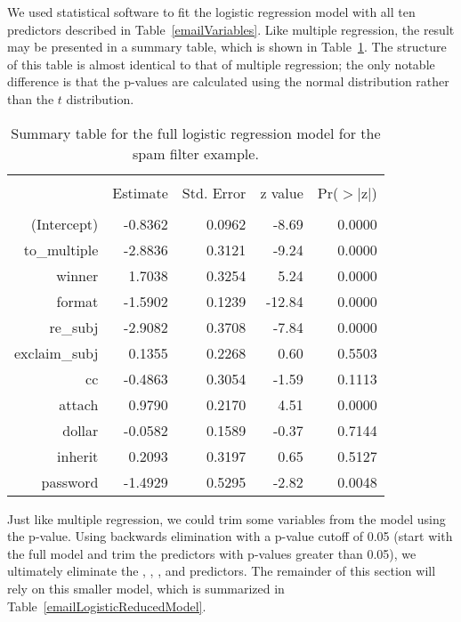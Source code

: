 We used statistical software to fit the logistic regression model with all ten predictors described in Table~\ref{emailVariables}. Like multiple regression, the result may be presented in a summary table, which is shown in Table~\ref{emailLogisticModelResults}. The structure of this table is almost identical to that of multiple regression; the only notable difference is that the p-values are calculated using the normal distribution rather than the $t$ distribution.

\begin{table}[ht]
\centering
\begin{tabular}{rrrrr}
  \hline
  \vspace{-3.7mm} & & & & \\
 & Estimate & Std. Error & z value & Pr($>$$|$z$|$) \\ 
  \hline
  \vspace{-3.8mm} & & & & \\
(Intercept) & -0.8362 & 0.0962 & -8.69 & 0.0000 \\ 
  to\_\hspace{0.3mm}multiple & -2.8836 & 0.3121 & -9.24 & 0.0000 \\ 
  winner & 1.7038 & 0.3254 & 5.24 & 0.0000 \\ 
  format & -1.5902 & 0.1239 & -12.84 & 0.0000 \\ 
  re\_\hspace{0.3mm}subj & -2.9082 & 0.3708 & -7.84 & 0.0000 \\ 
  exclaim\_\hspace{0.3mm}subj & 0.1355 & 0.2268 & 0.60 & 0.5503 \\ 
  cc & -0.4863 & 0.3054 & -1.59 & 0.1113 \\ 
  attach & 0.9790 & 0.2170 & 4.51 & 0.0000 \\ 
  dollar & -0.0582 & 0.1589 & -0.37 & 0.7144 \\ 
  inherit & 0.2093 & 0.3197 & 0.65 & 0.5127 \\ 
  password & -1.4929 & 0.5295 & -2.82 & 0.0048 \\ 
\hline
\end{tabular}
\caption{Summary table for the full logistic regression model for the spam filter example.}
\label{emailLogisticModelResults}
\end{table}

Just like multiple regression, we could trim some variables from the model using the p-value. Using backwards elimination with a p-value cutoff of 0.05 (start with the full model and trim the predictors with p-values greater than 0.05), we ultimately eliminate the , , , and  predictors. The remainder of this section will rely on this smaller model, which is summarized in Table~\ref{emailLogisticReducedModel}.


